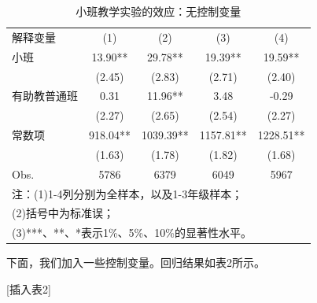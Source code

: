 \documentclass[cn,12pt,math=newtx,citestyle=gb7714-2015,bibstyle=gb7714-2015]{elegantbook}
\begin{document}
	\begin{center}
		\begin{table}[!h]
			\caption{小班教学实验的效应：无控制变量}\label{tab:digit}
			\begin{center}
				\begin{tabular}{lcccc}
					\hline
					解释变量&(1)&(2)&(3)&(4)\\
					\cline{1-5}
					小班&13.90**&29.78**&19.39**&19.59**\\
					&(2.45)&(2.83)&(2.71)&(2.40)\\
					
					有助教普通班&0.31&11.96**&3.48&-0.29\\
					&(2.27)&(2.65)&(2.54)&(2.27)\\
					
					常数项&918.04**&1039.39**&1157.81**&1228.51**\\
					&(1.63)&(1.78)&(1.82)&(1.68)\\
					
					\cline{1-5}
					Obs.&5786&6379&6049&5967\\
					
					\cline{1-5}
					\multicolumn{5}{l}{注：(1)1-4列分别为全样本，以及1-3年级样本；}\\
					\multicolumn{5}{l}{(2)括号中为标准误；}\\
					\multicolumn{5}{l}{(3)***、**、*表示1\%、5\%、10\%的显著性水平。}\\
					\hline
				\end{tabular}
			\end{center}
		\end{table}
	\end{center}
	
	下面，我们加入一些控制变量。回归结果如表2所示。
	\begin{center}
		[插入表2]
	\end{center}
	
\end{document}
